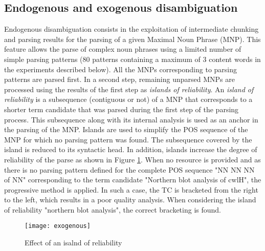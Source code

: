 \subsection{Endogenous and exogenous disambiguation}
\label{sec:endogenous}

Endogenous disambiguation consists in the exploitation of intermediate
chunking and parsing results for the parsing of a given Maximal Noun Phrase
(MNP). This feature
allows the parse of complex noun phrases using a limited number of
simple parsing patterns (80 patterns containing a maximum of 3
content words in the experiments described below). All the MNPs
corresponding to parsing patterns %
are
parsed first. In a second step, remaining unparsed MNPs are processed
using the results of the first step as \emph{islands of reliability}. 
An \emph{island of reliability} is a subsequence
(contiguous or not) of a MNP that corresponds %
to %
a shorter term candidate that was
parsed during the first step of the parsing process. This subsequence along with its internal analysis is used as
an anchor in the parsing of the MNP. Islands are used to simplify the
POS sequence of the MNP for which no parsing pattern was found. The subsequence covered by the island is
reduced to its syntactic head. In addition,   
islands increase the degree of reliability of the parse as shown in Figure \ref{fig:endogenous}.  When no resource is provided and as there is no parsing pattern defined for the complete POS sequence "NN NN NN of NN" corresponding to the term candidate "Northern blot analysis of cwlH", the progressive method is applied. In such a case, the TC is bracketed from the right to the left, which results in a poor quality analysis. When considering the island of reliability "northern blot analysis", the correct bracketing is found.
\begin{figure}[!htbp]
\centering
\texttt{[image: exogenous]}
  \caption{Effect of an isalnd of reliability}
  \label{fig:endogenous}
\end{figure}
